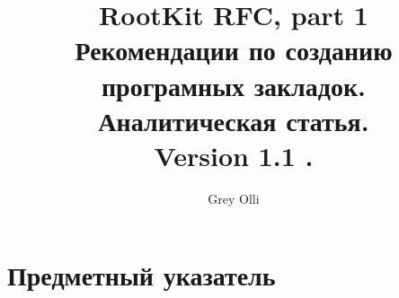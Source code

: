 \documentclass[a4paper,11pt]{article}
\author{Grey Olli}
\title{ RootKit RFC, part 1\\Рекомендации по созданию програмных закладок.\\Аналитическая статья.\\Version 1.1 .}
\begin{document}
\maketitle
\thispagestyle{empty}
\newpage
\tableofcontents
\newpage

%
\newpage

\newpage

\newpage

\newpage

\newpage

\newpage

\newpage

\newpage

\newpage

\newpage

\newpage

\newpage

\newpage

\newpage

\newpage
\section{Предметный указатель}
\printindex
%
\end{document}
